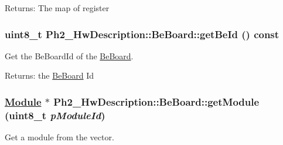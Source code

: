 \begin{Desc}
\item[Returns:]The map of register \end{Desc}
\hypertarget{class_ph2___hw_description_1_1_be_board_2da7431c4861caf9ff6e2667561ac8c5}{
\subsubsection[getBeId]{\setlength{\rightskip}{0pt plus 5cm}uint8\_\-t Ph2\_\-Hw\-Description::Be\-Board::get\-Be\-Id () const}}
\label{class_ph2___hw_description_1_1_be_board_2da7431c4861caf9ff6e2667561ac8c5}


Get the Be\-Board\-Id of the \hyperlink{class_ph2___hw_description_1_1_be_board}{Be\-Board}. 

\begin{Desc}
\item[Returns:]the \hyperlink{class_ph2___hw_description_1_1_be_board}{Be\-Board} Id \end{Desc}
\hypertarget{class_ph2___hw_description_1_1_be_board_71b8e3e970d554d7642bea8a9d21b037}{
\subsubsection[getModule]{\setlength{\rightskip}{0pt plus 5cm}\hyperlink{class_ph2___hw_description_1_1_module}{Module} $\ast$ Ph2\_\-Hw\-Description::Be\-Board::get\-Module (uint8\_\-t {\em p\-Module\-Id})}}
\label{class_ph2___hw_description_1_1_be_board_71b8e3e970d554d7642bea8a9d21b037}


Get a module from the vector. 

